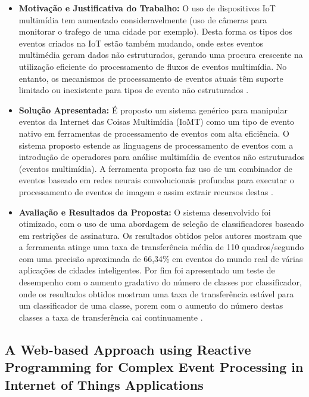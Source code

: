 \documentclass[tid,table]{texufpel} %
\begin{document}
\begin{itemize}
	\item \textbf{Motivação e Justificativa do Trabalho:} O uso de dispositivos IoT multimídia tem aumentado consideravelmente (uso de câmeras para monitorar o trafego de uma cidade por exemplo). Desta forma os tipos dos eventos criados na IoT estão também mudando, onde estes eventos multimédia geram dados não estruturados, gerando uma procura crescente na utilização eficiente do processamento de fluxos de eventos multimídia. No entanto, os mecanismos de processamento de eventos atuais têm suporte limitado ou inexistente para tipos de evento não estruturados \cite{art1aslam2018towards}.
	
	\item \textbf{Solução Apresentada:} É proposto um sistema genérico para manipular eventos da Internet das Coisas Multimídia (IoMT) como um tipo de evento nativo em ferramentas de processamento de eventos com alta eficiência. O sistema proposto estende as linguagens de processamento de eventos com a introdução de operadores para análise multimídia de eventos não estruturados (eventos multimídia). A ferramenta proposta faz uso de um combinador de eventos baseado em redes neurais convolucionais profundas para executar o processamento de eventos de imagem e assim extrair recursos destas \cite{art1aslam2018towards}.
	
	\item \textbf{Avaliação e Resultados da Proposta:} O sistema desenvolvido foi otimizado, com o uso de uma abordagem de seleção de classificadores baseado em restrições de assinatura. Os resultados obtidos pelos autores mostram que a ferramenta atinge uma taxa de transferência média de 110 quadros/segundo com uma precisão aproximada de 66,34\% em eventos do mundo real de várias aplicações de cidades inteligentes. Por fim foi apresentado um teste de desempenho com o aumento  gradativo do número de classes por classificador, onde os resultados obtidos mostram uma taxa de transferência estável para um classificador de uma classe, porem com o aumento do número destas classes a taxa de transferência cai continuamente \cite{art1aslam2018towards}.  
	
\end{itemize}


\subsection{A Web-based Approach using Reactive Programming for Complex Event Processing in Internet of Things Applications}
\end{document}
